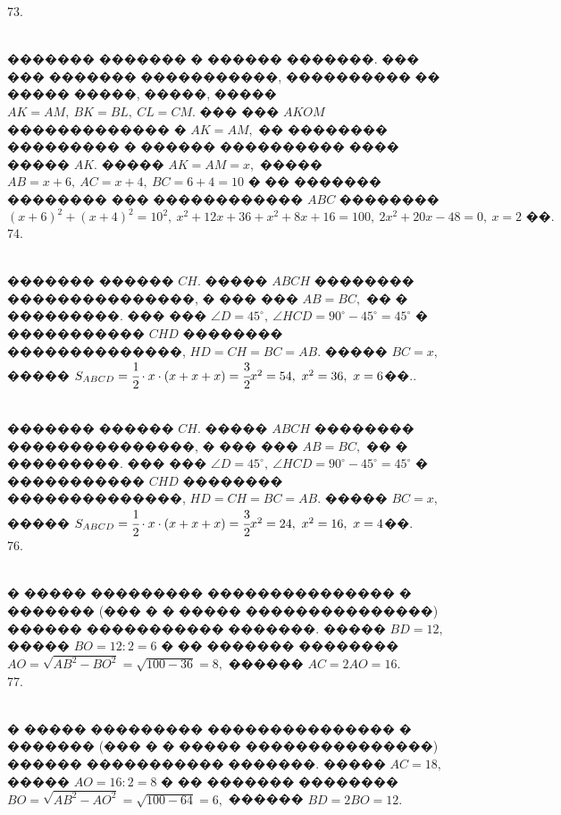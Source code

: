 \documentclass[12pt]{article}
\begin{document}
73. \begin{figure}[ht!]
\end{figure}\\
������� ������� � ������ �������. ��� ��� ������� �����������, ���������� �� ����� �����, �����, ����� $AK=AM,\ BK=BL,\ CL=CM.$ ��� ��� $AKOM$ ������������� � $AK=AM,$ �� �������� ��������� � ������ ���������� ���� ����� $AK.$ ����� $AK=AM=x,$ ����� $AB=x+6,\ AC=x+4,\ BC=6+4=10$ � �� ������� �������� ��� ������������ $ABC$ �������� $(x+6)^2+(x+4)^2=10^2,\ x^2+12x+36+x^2+8x+16=100,\ 2x^2+20x-48=0,\ x=2\text{ ��}.$\\
74. \begin{figure}[ht!]
\end{figure}\\
������� ������ $CH.$ ����� $ABCH$ �������� ���������������, � ��� ��� $AB=BC,$ �� � ���������. ��� ��� $\angle D=45^\circ,\ \angle HCD=90^\circ-45^\circ=45^\circ$ � ����������� $CHD$ �������� ��������������, $HD=CH=BC=AB.$ ����� $BC=x,$ ����� $S_{ABCD}=\cfrac{1}{2}\cdot{x}\cdot(x+x+x)=\cfrac{3}{2}x^2=54,\ x^2=36,\ x=6$��.\newpage{}. \begin{figure}[ht!]
\end{figure}\\
������� ������ $CH.$ ����� $ABCH$ �������� ���������������, � ��� ��� $AB=BC,$ �� � ���������. ��� ��� $\angle D=45^\circ,\ \angle HCD=90^\circ-45^\circ=45^\circ$ � ����������� $CHD$ �������� ��������������, $HD=CH=BC=AB.$ ����� $BC=x,$ ����� $S_{ABCD}=\cfrac{1}{2}\cdot{x}\cdot(x+x+x)=\cfrac{3}{2}x^2=24,\ x^2=16,\ x=4$��.\\
76. \begin{figure}[ht!]
\end{figure}\\
� ����� ��������� ��������������� � ������� (��� � � ����� ���������������) ������ ����������� �������. ����� $BD=12,$ ����� $BO=12:2=6$ � �� ������� �������� $AO=\sqrt{AB^2-BO^2}=\sqrt{100-36}=8,$ ������ $AC=2AO=16.$\\
77. \begin{figure}[ht!]
\end{figure}\\
� ����� ��������� ��������������� � ������� (��� � � ����� ���������������) ������ ����������� �������. ����� $AC=18,$ ����� $AO=16:2=8$ � �� ������� �������� $BO=\sqrt{AB^2-AO^2}=\sqrt{100-64}=6,$ ������ $BD=2BO=12.$\\
\end{document}
